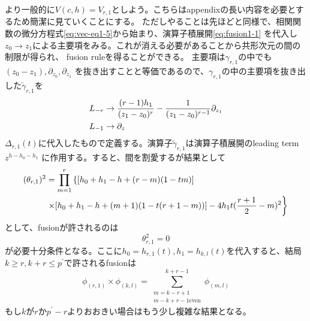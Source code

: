 \documentclass[11pt, aps, longbibliography]{article}
\numberwithin{equation}{section}
\begin{document}
        より一般的に$V(c,h)=V_{r,1}$としよう。こちらはappendixの長い内容を必要とするため簡潔に見ていくことにする。
        ただしやることは先ほどと同様で、相関関数の微分方程式\eqref{eq:vec-eq1-5}から始まり、演算子積展開\eqref{eq:fusion1-1}
        を代入し$z_0 \rightarrow z_1$による主要項をみる。これが消える必要があることから共形次元の間の制限が得られ、
        fusion ruleを得ることができる。
        主要項は$\gamma_{r,1}$の中でも$(z_0-z_1),\partial_{z_0}, \partial_{z_1}$
        を抜き出すことと等価であるので、$\gamma_{r,1}$の中の主要項を抜き出した$\tilde{\gamma}_{r,1}$を
        \begin{align}\label{eq:fusion1-9}
            L_{-r} &\rightarrow \frac{(r-1)h_1}{(z_1-z_0)^r} - \frac{1}{(z_1-z_0)^{r-1}}\partial_{z_1} \\
            L_{-1} &\rightarrow \partial_z \notag
        \end{align}
        $\Delta_{r,1}(t)$に代入したもので定義する。演算子$\tilde{\gamma}_{r,1}$は演算子積展開のleading term$z^{h-h_0-h_1}$
        に作用する。すると、間を割愛するが結果として
        \begin{align}\label{eq:fusion1-10}
            (\theta_{r,1})^2 &= \prod_{m=1}^r \left\{ [h_0+h_1-h+(r-m)(1-tm)]  \right. \notag \\
            & \left. \times[h_0+h_1-h+(m+1)(1-t(r+1-m))] - 4h_1t(\frac{r+1}{2}-m)^2 \right\}
        \end{align}
        として、fusionが許されるのは
        \begin{equation}\label{eq:fusion1-11}
            \theta_{r,1}^2 = 0
        \end{equation}
        が必要十分条件となる。ここに$h_0 = h_{r,1}(t), h_1 = h_{k,l}(t)$を代入すると、結局$k\geq r, k+r\leq p^\prime$で許されるfusionは
        \begin{equation}\label{eq:fusion1-12}
            \phi_{(r,1)} \times \phi_{(k,l)} = \sum_{\substack{m=k-r+1 \\ m-k+r-1 \text{even} }}^{k+r-1} \phi_{(m,l)}
        \end{equation}
        もし$k$が$r$か$p^\prime -r$よりおおきい場合はもう少し複雑な結果となる。
\end{document}
